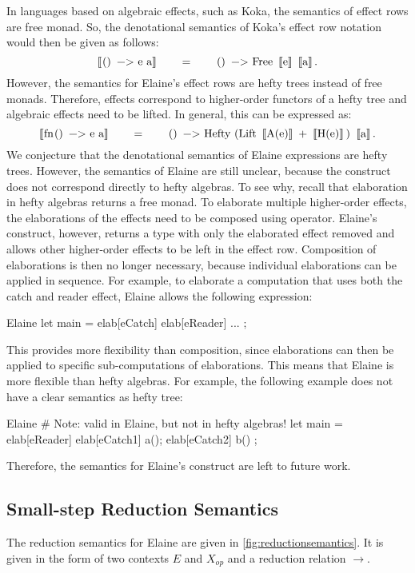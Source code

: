 In languages based on algebraic effects, such as Koka, the semantics of effect rows are free monad. So, the denotational semantics of Koka's effect row notation would then be given as follows:
\[
  \BB{() -> e a}
  \qquad=\qquad
  \mcode{() -> Free}\ \BB{e}\ \BB{a}.
\]
However, the semantics for Elaine's effect rows are hefty trees instead of free monads. Therefore, effects correspond to higher-order functors of a hefty tree and algebraic effects need to be lifted. In general, this can be expressed as:
\[
  \BB{fn() -> e a}
  \qquad=\qquad
  \mcode{() -> Hefty (Lift}\ \bb{A(e)}\ \mcode{+}\ \bb{H(e)}\mcode{)}\ \BB{a}.
\]
We conjecture that the denotational semantics of Elaine expressions are hefty trees. However, the semantics of Elaine are still unclear, because the  construct does not correspond directly to hefty algebras. To see why, recall that elaboration in hefty algebras returns a free monad. To elaborate multiple higher-order effects, the elaborations of the effects need to be composed using \hs{^} operator.
%
Elaine's  construct, however, returns a type with only the elaborated effect removed and allows other higher-order effects to be left in the effect row.
%
Composition of elaborations is then no longer necessary, because individual elaborations can be applied in sequence. For example, to elaborate a computation that uses both the catch and reader effect, Elaine allows the following expression:

\begin{lst}{Elaine}
let main = elab[eCatch] elab[eReader] { ... };
\end{lst}
%
This provides more flexibility than composition, since elaborations can then be applied to specific sub-computations of elaborations. This means that Elaine is more flexible than hefty algebras. For example, the following example does not have a clear semantics as hefty tree:

\begin{lst}{Elaine}
# Note: valid in Elaine, but not in hefty algebras!
let main = elab[eReader] {
    elab[eCatch1] a();
    elab[eCatch2] b()
};
\end{lst}

Therefore, the semantics for Elaine's  construct are left to future work.

\subsection{Small-step Reduction Semantics}
The reduction semantics for Elaine are given in \cref{fig:reductionsemantics}. It is given in the form of two contexts $E$ and $X_{op}$ and a reduction relation $\longrightarrow$.

